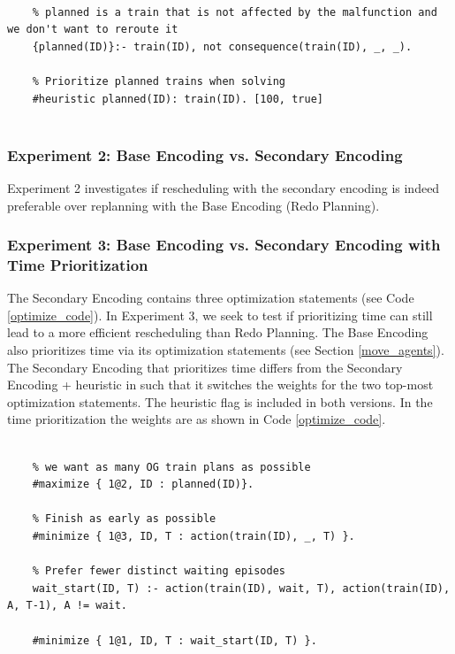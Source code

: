 \documentclass[runningheads]{llncs}
\begin{document}
\begin{lstlisting}[style=mystyle, language=Clingo, caption={The heuristic flag in line 6 prioritizes solutions with planned trains.}, label=heuristic_code]
	
	% planned is a train that is not affected by the malfunction and we don't want to reroute it
	{planned(ID)}:- train(ID), not consequence(train(ID), _, _).
	
	% Prioritize planned trains when solving
	#heuristic planned(ID): train(ID). [100, true]
	
\end{lstlisting}

\subsubsection{Experiment 2: Base Encoding vs. Secondary Encoding}
Experiment 2 investigates if rescheduling with the secondary encoding is indeed preferable over replanning with the Base Encoding (Redo Planning).


\subsubsection{Experiment 3: Base Encoding vs. Secondary Encoding with Time Prioritization}
The Secondary Encoding contains three optimization statements (see Code \ref{optimize_code}). In Experiment 3, we seek to test if prioritizing time can still lead to a more efficient rescheduling than Redo Planning. The Base Encoding also prioritizes time via its optimization statements (see Section \ref{move_agents}). The Secondary Encoding that prioritizes time differs from the Secondary Encoding + heuristic in such that it switches the weights for the two top-most optimization statements. The heuristic flag is included in both versions. In the time prioritization the weights are as shown in Code \ref{optimize_code}. 


\begin{lstlisting}[style=mystyle, language=Clingo, caption={Optimization statements in Secondary Encoding + time prioritization.}, label=optimize_code]
	
	% we want as many OG train plans as possible
	#maximize { 1@2, ID : planned(ID)}.

	% Finish as early as possible
	#minimize { 1@3, ID, T : action(train(ID), _, T) }.

	% Prefer fewer distinct waiting episodes
	wait_start(ID, T) :- action(train(ID), wait, T), action(train(ID), A, T-1), A != wait.

	#minimize { 1@1, ID, T : wait_start(ID, T) }.
	
\end{lstlisting}
\end{document}
